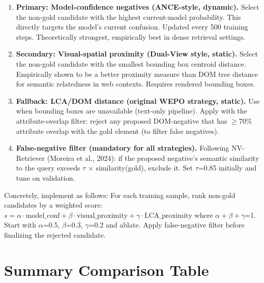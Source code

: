 \documentclass[pdflatex,sn-mathphys-num]{sn-jnl}
\theoremstyle{thmstyleone}
\theoremstyle{thmstyletwo}
\theoremstyle{thmstylethree}
\begin{document}
\begin{enumerate}
    \item \textbf{Primary: Model-confidence negatives (ANCE-style, dynamic).} Select the non-gold candidate with the highest current-model probability. This directly targets the model's current confusion. Updated every 500 training steps. Theoretically strongest, empirically best in dense retrieval settings.
    \item \textbf{Secondary: Visual-spatial proximity (Dual-View style, static).} Select the non-gold candidate with the smallest bounding box centroid distance. Empirically shown to be a better proximity measure than DOM tree distance for semantic relatedness in web contexts. Requires rendered bounding boxes.
    \item \textbf{Fallback: LCA/DOM distance (original WEPO strategy, static).} Use when bounding boxes are unavailable (text-only pipeline). Apply with the attribute-overlap filter: reject any proposed DOM-negative that has $\ge$70\% attribute overlap with the gold element (to filter false negatives).
    \item \textbf{False-negative filter (mandatory for all strategies).} Following NV-Retriever (Moreira et al., 2024): if the proposed negative's semantic similarity to the query exceeds $\tau$ $\times$ similarity(gold), exclude it. Set $\tau$=0.85 initially and tune on validation.
\end{enumerate}

Concretely, implement as follows: For each training sample, rank non-gold candidates by a weighted score: $s = \alpha \cdot \text{model\_conf} + \beta \cdot \text{visual\_proximity} + \gamma \cdot \text{LCA\_proximity}$ where $\alpha+\beta+\gamma$=1. Start with $\alpha$=0.5, $\beta$=0.3, $\gamma$=0.2 and ablate. Apply false-negative filter before finalizing the rejected candidate.

\section{Summary Comparison Table}
\end{document}
